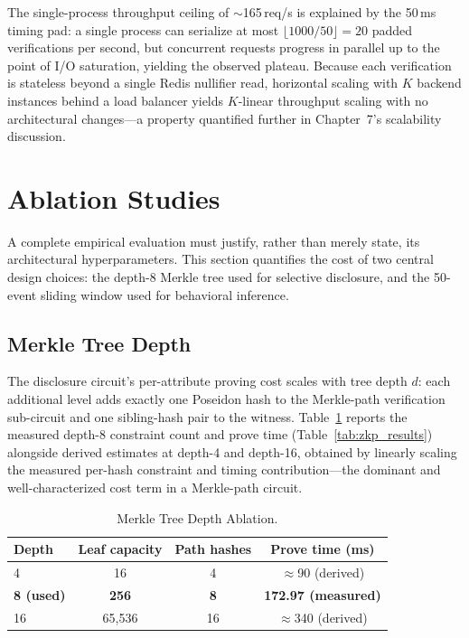 \documentclass[12pt,a4paper,oneside]{report}
\begin{document}
The single-process throughput ceiling of $\sim$165\,req/s is explained by
the 50\,ms timing pad: a single process can serialize at most
$\lfloor 1000/50 \rfloor = 20$ padded verifications per second, but
concurrent requests progress in parallel up to the point of I/O
saturation, yielding the observed plateau. Because each verification is
stateless beyond a single Redis nullifier read, horizontal scaling with
$K$ backend instances behind a load balancer yields $K$-linear throughput
scaling with no architectural changes---a property quantified further in
Chapter~7's scalability discussion.

\section{Ablation Studies}
\label{sec:ablations}

A complete empirical evaluation must justify, rather than merely state,
its architectural hyperparameters. This section quantifies the cost of
two central design choices: the depth-8 Merkle tree used for selective
disclosure, and the 50-event sliding window used for behavioral
inference.

\subsection{Merkle Tree Depth}

The disclosure circuit's per-attribute proving cost scales with tree
depth $d$: each additional level adds exactly one Poseidon hash to the
Merkle-path verification sub-circuit and one sibling-hash pair to the
witness. Table~\ref{tab:merkle_ablation} reports the measured depth-8
constraint count and prove time (Table~\ref{tab:zkp_results}) alongside
derived estimates at depth-4 and depth-16, obtained by linearly scaling
the measured per-hash constraint and timing contribution---the dominant
and well-characterized cost term in a Merkle-path circuit.

\begin{table}[htbp]
\renewcommand{\arraystretch}{1.2}
\caption{Merkle Tree Depth Ablation.}
\label{tab:merkle_ablation}
\centering
\begin{tabular}{lccc}
\toprule
\textbf{Depth} & \textbf{Leaf capacity} & \textbf{Path hashes} & \textbf{Prove time (ms)} \\
\midrule
4              & 16    & 4  & $\approx$90 (derived) \\
\textbf{8 (used)} & \textbf{256}  & \textbf{8}  & \textbf{172.97 (measured)} \\
16             & 65{,}536 & 16 & $\approx$340 (derived) \\
\bottomrule
\end{tabular}
\end{table}
\end{document}
